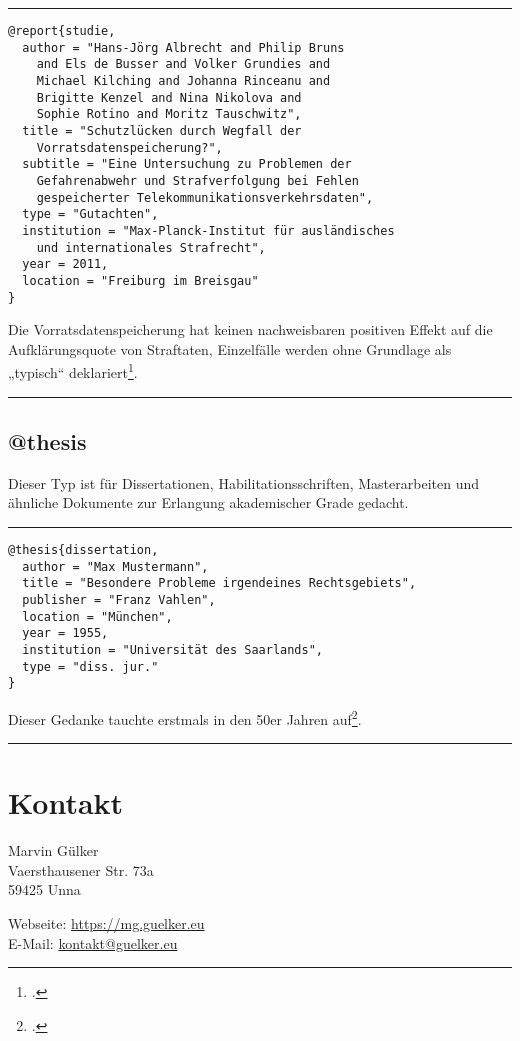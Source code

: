 \documentclass[11pt,a4paper,DIV=calc]{scrartcl}
\newenvironment{rubexample}{\par\vspace{\baselineskip}\hrule\par\begin{refsection}}{\end{refsection}\par\hrule\par\vspace{\baselineskip}}
\begin{document}
\begin{rubexample}
\begin{verbatim}
@report{studie,
  author = "Hans-Jörg Albrecht and Philip Bruns
    and Els de Busser and Volker Grundies and
    Michael Kilching and Johanna Rinceanu and
    Brigitte Kenzel and Nina Nikolova and
    Sophie Rotino and Moritz Tauschwitz",
  title = "Schutzlücken durch Wegfall der
    Vorratsdatenspeicherung?",
  subtitle = "Eine Untersuchung zu Problemen der
    Gefahrenabwehr und Strafverfolgung bei Fehlen
    gespeicherter Telekommunikationsverkehrsdaten",
  type = "Gutachten",
  institution = "Max-Planck-Institut für ausländisches
    und internationales Strafrecht",
  year = 2011,
  location = "Freiburg im Breisgau"
}
\end{verbatim}

Die Vorratsdatenspeicherung hat keinen nachweisbaren positiven Effekt
auf die Aufklärungsquote von Straftaten, Einzelfälle werden ohne
Grundlage als „typisch“ deklariert\footcite[218f.]{studie}.

\printbibliography
\end{rubexample}

\subsection{@thesis}

Dieser Typ ist für Dissertationen, Habilitationsschriften,
Masterarbeiten und ähnliche Dokumente zur Erlangung akademischer
Grade gedacht.

\begin{rubexample}
\begin{verbatim}
@thesis{dissertation,
  author = "Max Mustermann",
  title = "Besondere Probleme irgendeines Rechtsgebiets",
  publisher = "Franz Vahlen",
  location = "München",
  year = 1955,
  institution = "Universität des Saarlands",
  type = "diss. jur."
}
\end{verbatim}

Dieser Gedanke tauchte erstmals in den 50er Jahren
auf\footcite[123]{dissertation}.

\printbibliography
\end{rubexample}

\section{Kontakt}\label{sec:kontakt}

Marvin Gülker\\
Vaersthausener Str. 73a\\
59425 Unna

\begin{tabbing}
  Webseite: \= \href{https://mg.guelker.eu}{https://mg.guelker.eu}\\
  E-Mail:   \> \href{mailto:kontakt@guelker.eu}{kontakt@guelker.eu}
\end{tabbing}
\end{document}
